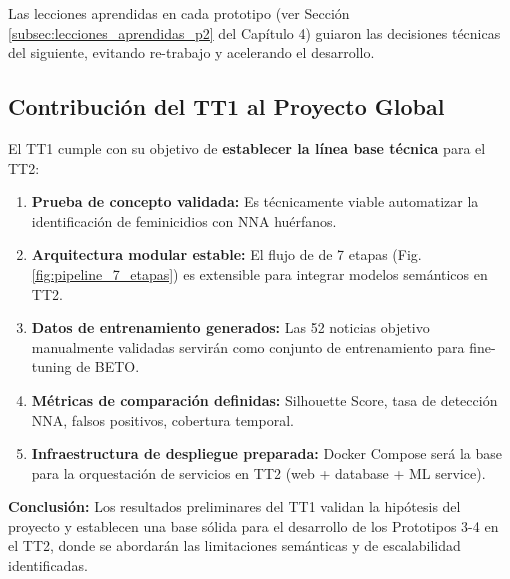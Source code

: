 Las lecciones aprendidas en cada prototipo (ver Sección \ref{subsec:lecciones_aprendidas_p2} del Capítulo 4) guiaron las decisiones técnicas del siguiente, evitando re-trabajo y acelerando el desarrollo.

\subsection{Contribución del TT1 al Proyecto Global}
\label{subsec:contribucion_tt1}

El TT1 cumple con su objetivo de \textbf{establecer la línea base técnica} para el TT2:

\begin{enumerate}
    \item \textbf{Prueba de concepto validada:} Es técnicamente viable automatizar la identificación de feminicidios con NNA huérfanos.
    \item \textbf{Arquitectura modular estable:} El flujo de de 7 etapas (Fig. \ref{fig:pipeline_7_etapas}) es extensible para integrar modelos semánticos en TT2.
    \item \textbf{Datos de entrenamiento generados:} Las 52 noticias objetivo manualmente validadas servirán como conjunto de entrenamiento para fine-tuning de BETO.
    \item \textbf{Métricas de comparación definidas:} Silhouette Score, tasa de detección NNA, falsos positivos, cobertura temporal.
    \item \textbf{Infraestructura de despliegue preparada:} Docker Compose será la base para la orquestación de servicios en TT2 (web + database + ML service).
\end{enumerate}

\textbf{Conclusión:} Los resultados preliminares del TT1 validan la hipótesis del proyecto y establecen una base sólida para el desarrollo de los Prototipos 3-4 en el TT2, donde se abordarán las limitaciones semánticas y de escalabilidad identificadas.